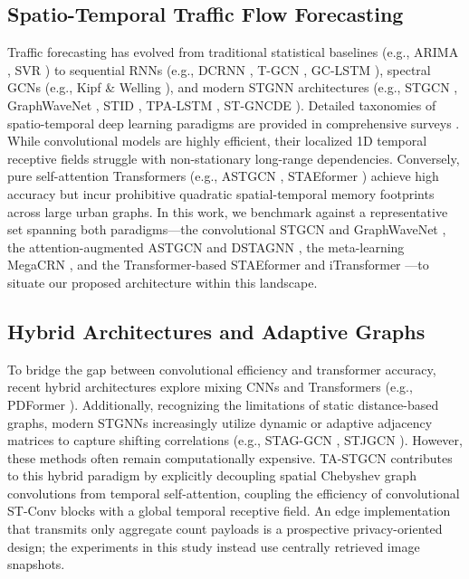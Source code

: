 \documentclass[journal,twocolumn]{IEEEtran}
\begin{document}
\subsection{Spatio-Temporal Traffic Flow Forecasting}
Traffic forecasting has evolved from traditional statistical baselines (e.g., ARIMA \cite{arima}, SVR \cite{svr}) to sequential RNNs (e.g., DCRNN \cite{dcrnn}, T-GCN \cite{tgcn}, GC-LSTM \cite{gclstm}), spectral GCNs (e.g., Kipf \& Welling \cite{gcn}), and modern STGNN architectures (e.g., STGCN \cite{stgcn}, GraphWaveNet \cite{wavenet}, STID \cite{stid}, TPA-LSTM \cite{tpalstm}, ST-GNCDE \cite{stgncde}). Detailed taxonomies of spatio-temporal deep learning paradigms are provided in comprehensive surveys \cite{yin_survey, gnn_survey}. While convolutional models are highly efficient, their localized 1D temporal receptive fields struggle with non-stationary long-range dependencies. Conversely, pure self-attention Transformers (e.g., ASTGCN \cite{astgcn}, STAEformer \cite{staeformer}) achieve high accuracy but incur prohibitive quadratic spatial-temporal memory footprints across large urban graphs. In this work, we benchmark against a representative set spanning both paradigms---the convolutional STGCN \cite{stgcn} and GraphWaveNet \cite{wavenet}, the attention-augmented ASTGCN \cite{astgcn} and DSTAGNN \cite{dstagnn}, the meta-learning MegaCRN \cite{megacrn}, and the Transformer-based STAEformer \cite{staeformer} and iTransformer \cite{itransformer}---to situate our proposed architecture within this landscape.

\subsection{Hybrid Architectures and Adaptive Graphs}
To bridge the gap between convolutional efficiency and transformer accuracy, recent hybrid architectures explore mixing CNNs and Transformers (e.g., PDFormer \cite{pdformer}). Additionally, recognizing the limitations of static distance-based graphs, modern STGNNs increasingly utilize dynamic or adaptive adjacency matrices to capture shifting correlations (e.g., STAG-GCN \cite{staggcn}, STJGCN \cite{stjgcn}). However, these methods often remain computationally expensive. TA-STGCN contributes to this hybrid paradigm by explicitly decoupling spatial Chebyshev graph convolutions from temporal self-attention, coupling the efficiency of convolutional ST-Conv blocks with a global temporal receptive field. An edge implementation that transmits only aggregate count payloads is a prospective privacy-oriented design; the experiments in this study instead use centrally retrieved image snapshots.
\end{document}
